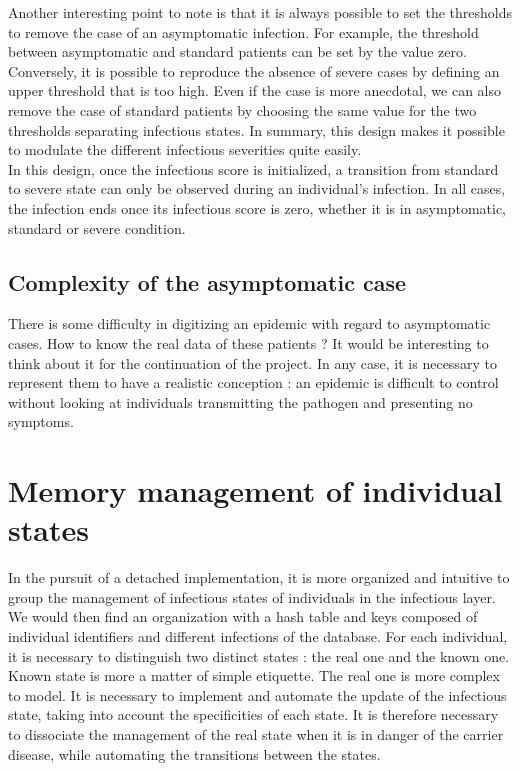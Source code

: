Another interesting point to note is that it is always possible to set the thresholds to remove the case of an asymptomatic infection. For example, the threshold between asymptomatic and standard patients can be set by the value zero. Conversely, it is possible to reproduce the absence of severe cases by defining an upper threshold that is too high. Even if the case is more anecdotal, we can also remove the case of standard patients by choosing the same value for the two thresholds separating infectious states. In summary, this design makes it possible to modulate the different infectious severities quite easily.\\

In this design, once the infectious score is initialized, a transition from standard to severe state can only be observed during an individual's infection. In all cases, the infection ends once its infectious score is zero, whether it is in asymptomatic, standard or severe condition.\\

\subsection{Complexity of the asymptomatic case}

There is some difficulty in digitizing an epidemic with regard to asymptomatic cases. How to know the real data of these patients ? It would be interesting to think about it for the continuation of the project. In any case, it is necessary to represent them to have a realistic conception : an epidemic is difficult to control without looking at individuals transmitting the pathogen and presenting no symptoms.\\

\newpage

\section{Memory management of individual states}

In the pursuit of a detached implementation, it is more organized and intuitive to group the management of infectious states of individuals in the infectious layer. We would then find an organization with a hash table and keys composed of individual identifiers and different infections of the database. For each individual, it is necessary to distinguish two distinct states : the real one and the known one. Known state is more a matter of simple etiquette. The real one is more complex to model. It is necessary to implement and automate the update of the infectious state, taking into account the specificities of each state. It is therefore necessary to dissociate the management of the real state when it is in danger of the carrier disease, while automating the transitions between the states.
